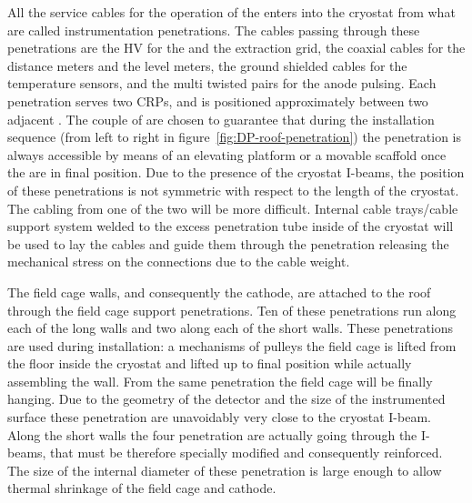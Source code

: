 All the service cables for the operation of the  enters into the cryostat from what are called  instrumentation penetrations.
The cables passing through these penetrations are the HV for the  and the extraction grid, the coaxial cables for the distance meters and the level meters, the ground shielded cables for the temperature sensors, and the multi twisted pairs for the anode pulsing.
Each penetration serves two CRPs, and is positioned approximately between two adjacent .
The couple of  are chosen to guarantee that during the installation sequence (from left to right in figure~\ref{fig:DP-roof-penetration}) the penetration is always accessible by means of an elevating platform or a movable scaffold once the  are in final position.
Due to the presence of the cryostat I-beams, the position of these penetrations is not symmetric with respect to the length of the cryostat.
The cabling from one of the two  will be more difficult.
Internal cable trays/cable support system welded to the excess penetration tube inside of the cryostat will be used to lay the cables and guide them through the penetration releasing the mechanical stress on the connections due to the cable weight.

The field cage walls, and consequently the cathode, are attached to the roof through the field cage support penetrations.
Ten of these penetrations run along each of the long walls and two along each of the short walls.
These penetrations are used during installation: a mechanisms of pulleys the field cage is lifted from the floor inside the cryostat and lifted up to final position while actually assembling the wall.
From the same penetration the field cage will be finally hanging.
Due to the geometry of the detector and the size of the instrumented surface these penetration are unavoidably very close to the cryostat I-beam.
Along the short walls the four penetration are actually going through the I-beams, that must be therefore specially modified and consequently reinforced.
The size of the internal diameter of these penetration is large enough to allow thermal shrinkage of the field cage and cathode.

